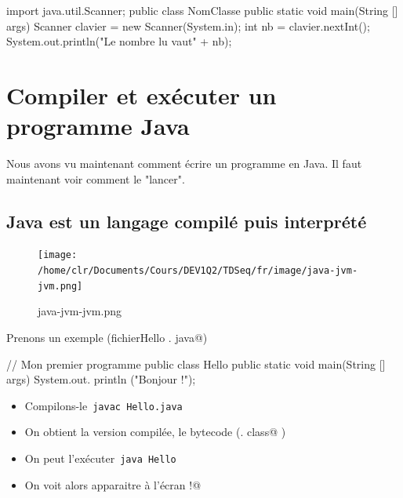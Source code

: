 \documentclass[11pt,a4paper]{article}
\begin{document}
            \par
        \begin{Java}
import java.util.Scanner;
public class NomClasse {
    public static void main(String [] args) {
        Scanner clavier = new Scanner(System.in);
        int nb = clavier.nextInt();
        System.out.println("Le nombre lu vaut" + nb);
    }
}
        \end{Java}\section{Compiler et ex\'ecuter un programme Java}
				Nous avons vu maintenant comment \'ecrire un programme en Java. Il faut maintenant voir comment le "lancer".
      
            \par
        \subsection{Java est un langage compil\'e puis interpr\'et\'e}\begin{figure}[hbt]
				    \begin{center}
					\texttt{[image: /home/clr/Documents/Cours/DEV1Q2/TDSeq/fr/image/java-jvm-jvm.png]}
						\end{center}
                
                    \caption[java-jvm-jvm.png]{java-jvm-jvm.png}
                \end{figure}
                    
            \par
        
          Prenons un exemple (fichier\verb@ Hello . java@)
          
            \par
        \begin{Java}
// Mon premier programme
public class Hello {
    public static void main(String [] args) {
        System.out. println ("Bonjour !");
    }
}
        \end{Java}
					\begin{itemize}
				
			\item Compilons-le \,\verb|javac Hello.java|\,
			\item On obtient la version compil\'ee, le bytecode (\verb@Hello . class@ )
			\item On peut l'ex\'ecuter \,\verb|java Hello|\,
			\item On voit alors apparaitre \`a l'\'ecran \verb@Bonjour !@
					\end{itemize}
				
\end{document}
